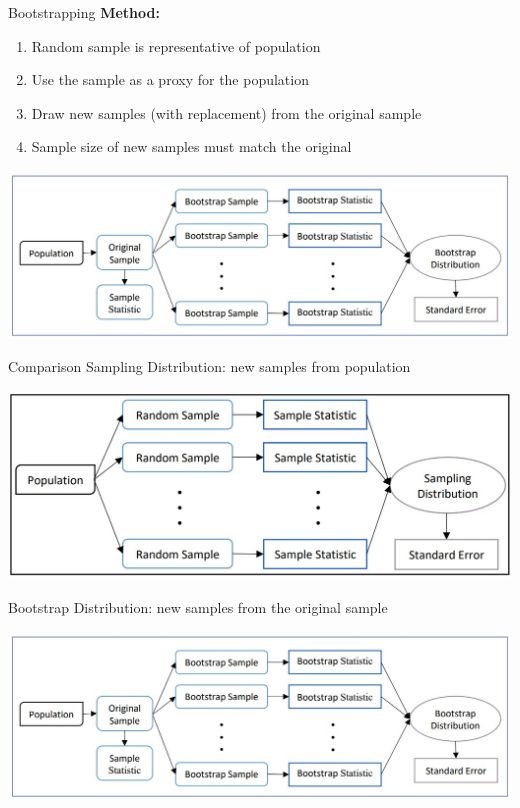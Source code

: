 \documentclass{beamer}
\begin{document}
\begin{frame}{Bootstrapping}
\textbf{Method:}
\begin{enumerate}
    \item Random sample is representative of population
    \item Use the sample as a proxy for the population
    \item Draw new samples (with replacement) from the original sample
    \item Sample size of new samples must match the original
\end{enumerate}
\begin{center}
    \includegraphics[scale=.6]{img/bootstrap_process.jpg}
\end{center}
\end{frame}

\begin{frame}{Comparison}
Sampling Distribution: new samples from population
\begin{center}
    \includegraphics[scale=.49]{img/sampling_distr_method.jpg}
\end{center}

Bootstrap Distribution: new samples from the original sample
\begin{center}
    \includegraphics[scale=.5]{img/bootstrap_process.jpg}
\end{center}
\end{frame}
\end{document}
